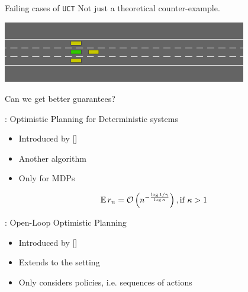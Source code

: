 \documentclass{beamer}
\begin{document}
\begin{frame}{Failing cases of \texttt{UCT}}
    Not just a theoretical counter-example.
    \begin{center}
    \includegraphics[width=0.8\textwidth]{img/uct_trap}\\
    \bigskip
    
    \end{center}
\end{frame}

\begin{frame}{Can we get better guarantees?}
    \begin{block}{\OPD: Optimistic Planning for Deterministic systems}
    \begin{itemize}
        \item Introduced by [\cite{Hren2008}]
        \item Another  algorithm
        \item Only for  MDPs
    \end{itemize}
    \end{block}
    \begin{theorem}
    \begin{equation*}
    \expectedvalue r_n = 
      \cO\left(n^{-\frac{\log 1/\gamma}{\log \kappa}}\right), \text{if}\ \kappa > 1 
    \end{equation*}
    \end{theorem}
    \pause
\begin{block}{\OLOP: Open-Loop Optimistic Planning}
    \begin{itemize}
        \item Introduced by [\cite{Bubeck2010}]
        \item Extends \OPD to the  setting
        \item Only considers  policies, i.e. sequences of actions
    \end{itemize}
    \end{block}
\end{frame}
\end{document}
